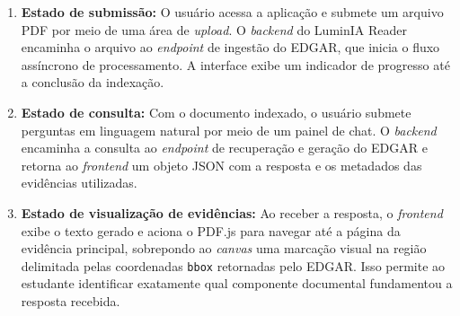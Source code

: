 \begin{enumerate}
\item \textbf{Estado de submissão:} O usuário acessa a aplicação e submete um arquivo PDF por meio de uma área de \textit{upload}. O \textit{backend} do LuminIA Reader encaminha o arquivo ao \textit{endpoint} de ingestão do EDGAR, que inicia o fluxo assíncrono de processamento. A interface exibe um indicador de progresso até a conclusão da indexação.

\item \textbf{Estado de consulta:} Com o documento indexado, o usuário submete perguntas em linguagem natural por meio de um painel de chat. O \textit{backend} encaminha a consulta ao \textit{endpoint} de recuperação e geração do EDGAR e retorna ao \textit{frontend} um objeto JSON com a resposta e os metadados das evidências utilizadas.

\item \textbf{Estado de visualização de evidências:} Ao receber a resposta, o \textit{frontend} exibe o texto gerado e aciona o PDF.js para navegar até a página da evidência principal, sobrepondo ao \textit{canvas} uma marcação visual na região delimitada pelas coordenadas \texttt{bbox} retornadas pelo EDGAR. Isso permite ao estudante identificar exatamente qual componente documental fundamentou a resposta recebida.

\end{enumerate}
